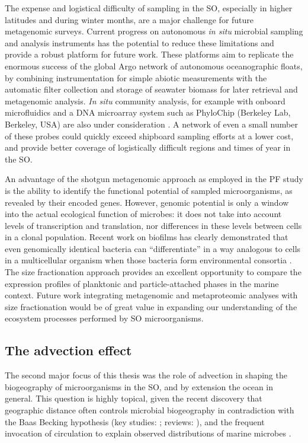 The expense and logistical difficulty of sampling in the \ac{SO}, especially in higher latitudes and during winter months, are a major challenge for future metagenomic surveys.
Current progress on autonomous \textit{in situ} microbial sampling and analysis instruments \cite{CSIRO:2012uw} has the potential to reduce these limitations and provide a robust platform for future work.
These platforms aim to replicate the enormous success of the global Argo network of autonomous oceanographic floats, by combining instrumentation for simple abiotic measurements with the automatic filter collection and storage of seawater biomass for later retrieval and metagenomic analysis.
\textit{In situ} community analysis, for example with onboard microfluidics and a DNA microarray system such as PhyloChip (Berkeley Lab, Berkeley, USA) are also under consideration \cite{CSIRO:2012uw}.
A network of even a small number of these probes could quickly exceed shipboard sampling efforts at a lower cost, and provide better coverage of logistically difficult regions and times of year in the \ac{SO}.

An advantage of the shotgun metagenomic approach as employed in the \ac{PF} study is the ability to identify the functional potential of sampled microorganisms, as revealed by their encoded genes.
However, genomic potential is only a window into the actual ecological function of microbes: it does not take into account levels of transcription and translation, nor differences in these levels between cells in a clonal population.
Recent work on biofilms has clearly demonstrated that even genomically identical bacteria can ``differentiate'' in a way analogous to cells in a multicellular organism when those bacteria form environmental consortia \cite{Sauer:2002ux}.
The size fractionation approach provides an excellent opportunity to compare the expression profiles of planktonic and particle-attached \citep[i.e.\ potentially biofilm-forming; see][]{Grossart:2003uv} phases in the marine context.
Future work integrating metagenomic and metaproteomic analyses with size fractionation would be of great value in expanding our understanding of the ecosystem processes performed by \ac{SO} microorganisms.

\subsection{The advection effect}

The second major focus of this thesis was the role of advection in shaping the biogeography of microorganisms in the \ac{SO}, and by extension the ocean in general.
This question is highly topical, given the recent discovery that geographic distance often controls microbial biogeography in contradiction with the Baas Becking hypothesis (key studies: \citet{Cho:2000tn,Whitaker:2003dz}; reviews: \citet{Martiny:2006jy,Hanson:2012cb}), and the frequent invocation of circulation to explain observed distributions of marine microbes \citep[e.g.][]{Lauro:2007bf,Giebel:2009hr,Ghiglione:2012ei,Sul:2013in}.

